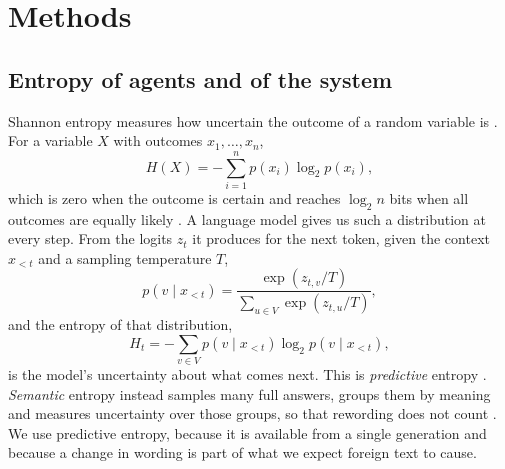 \section{Methods}
\label{sec:methods}



\subsection{Entropy of agents and of the system}
\label{sec:entropy}

Shannon entropy measures how uncertain the outcome of a random variable is \parencite{shannon1948mathematical}. For a variable $X$ with outcomes $x_1, \ldots, x_n$,
\begin{equation}
  H(X) = - \sum_{i=1}^{n} p(x_i) \log_2 p(x_i),
  \label{eq:shannon}
\end{equation}
which is zero when the outcome is certain and reaches $\log_2 n$ bits when all outcomes are equally likely \parencite{cover2006elements}. A language model gives us such a distribution at every step. From the logits $z_t$ it produces for the next token, given the context $x_{<t}$ and a sampling temperature $T$,
\begin{equation}
  p(v \mid x_{<t}) = \frac{\exp\left(z_{t,v} / T\right)}{\sum_{u \in V} \exp\left(z_{t,u} / T\right)},
  \label{eq:softmax}
\end{equation}
and the entropy of that distribution,
\begin{equation}
  H_t = - \sum_{v \in V} p(v \mid x_{<t}) \log_2 p(v \mid x_{<t}),
  \label{eq:token_entropy}
\end{equation}
is the model's uncertainty about what comes next. This is \emph{predictive} entropy \parencite{malinin2021uncertainty}. \emph{Semantic} entropy instead samples many full answers, groups them by meaning and measures uncertainty over those groups, so that rewording does not count \parencite{kuhn2023semantic, shannon_hallucination}. We use predictive entropy, because it is available from a single generation and because a change in wording is part of what we expect foreign text to cause.

